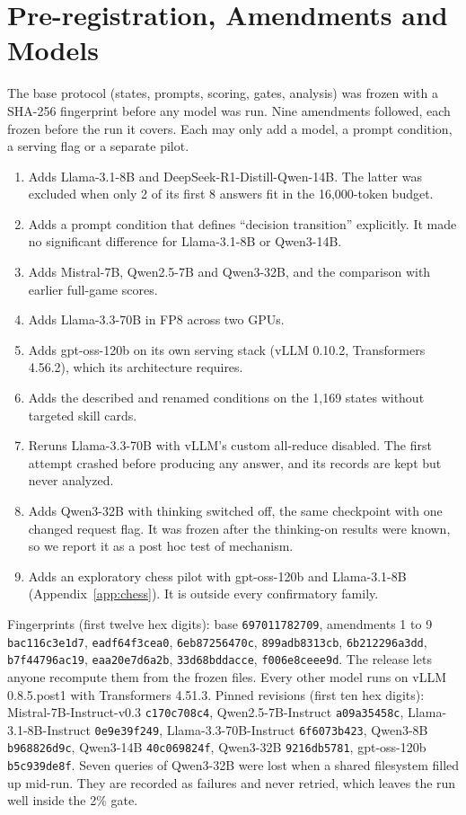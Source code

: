 \section{Pre-registration, Amendments and Models}
\label{app:amendments}

The base protocol (states, prompts, scoring, gates, analysis) was frozen with a SHA-256 fingerprint before any model was run. Nine amendments followed, each frozen before the run it covers. Each may only add a model, a prompt condition, a serving flag or a separate pilot.
\begin{enumerate}
\item Adds Llama-3.1-8B and DeepSeek-R1-Distill-Qwen-14B. The latter was excluded when only 2 of its first 8 answers fit in the 16,000-token budget.
\item Adds a prompt condition that defines ``decision transition'' explicitly. It made no significant difference for Llama-3.1-8B or Qwen3-14B.
\item Adds Mistral-7B, Qwen2.5-7B and Qwen3-32B, and the comparison with earlier full-game scores.
\item Adds Llama-3.3-70B in FP8 across two GPUs.
\item Adds gpt-oss-120b on its own serving stack (vLLM 0.10.2, Transformers 4.56.2), which its architecture requires.
\item Adds the described and renamed conditions on the 1,169 states without targeted skill cards.
\item Reruns Llama-3.3-70B with vLLM's custom all-reduce disabled. The first attempt crashed before producing any answer, and its records are kept but never analyzed.
\item Adds Qwen3-32B with thinking switched off, the same checkpoint with one changed request flag. It was frozen after the thinking-on results were known, so we report it as a post hoc test of mechanism.
\item Adds an exploratory chess pilot with gpt-oss-120b and Llama-3.1-8B (Appendix~\ref{app:chess}). It is outside every confirmatory family.
\end{enumerate}
Fingerprints (first twelve hex digits): base \texttt{697011782709}, amendments 1 to 9 \texttt{bac116c3e1d7}, \texttt{eadf64f3cea0}, \texttt{6eb87256470c}, \texttt{899adb8313cb}, \texttt{6b212296a3dd}, \texttt{b7f44796ac19}, \texttt{eaa20e7d6a2b}, \texttt{33d68bddacce}, \texttt{f006e8ceee9d}. The release lets anyone recompute them from the frozen files. Every other model runs on vLLM 0.8.5.post1 with Transformers 4.51.3. Pinned revisions (first ten hex digits): Mistral-7B-Instruct-v0.3 \texttt{c170c708c4}, Qwen2.5-7B-Instruct \texttt{a09a35458c}, Llama-3.1-8B-Instruct \texttt{0e9e39f249}, Llama-3.3-70B-Instruct \texttt{6f6073b423}, Qwen3-8B \texttt{b968826d9c}, Qwen3-14B \texttt{40c069824f}, Qwen3-32B \texttt{9216db5781}, gpt-oss-120b \texttt{b5c939de8f}. Seven queries of Qwen3-32B were lost when a shared filesystem filled up mid-run. They are recorded as failures and never retried, which leaves the run well inside the 2\% gate.

